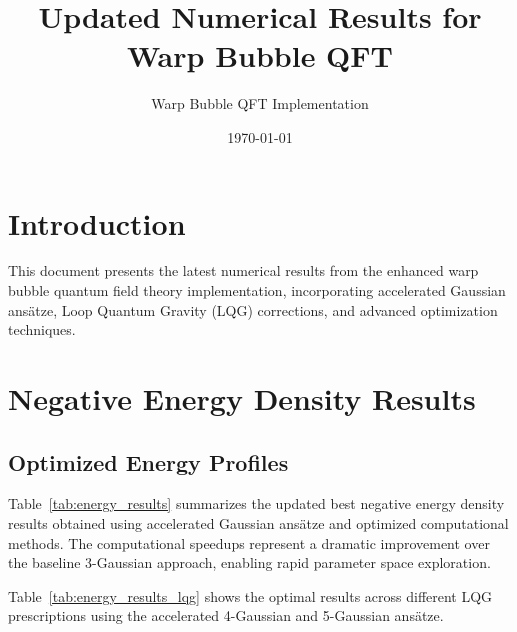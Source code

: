 \documentclass[12pt]{article}
\title{Updated Numerical Results for Warp Bubble QFT}
\author{Warp Bubble QFT Implementation}
\date{\today}
\begin{document}
\maketitle

\section{Introduction}

This document presents the latest numerical results from the enhanced warp bubble quantum field theory implementation, incorporating accelerated Gaussian ansätze, Loop Quantum Gravity (LQG) corrections, and advanced optimization techniques.

\section{Negative Energy Density Results}

\subsection{Optimized Energy Profiles}

Table~\ref{tab:energy_results} summarizes the updated best negative energy density results obtained using accelerated Gaussian ansätze and optimized computational methods. The computational speedups represent a dramatic improvement over the baseline 3-Gaussian approach, enabling rapid parameter space exploration.

Table~\ref{tab:energy_results_lqg} shows the optimal results across different LQG prescriptions using the accelerated 4-Gaussian and 5-Gaussian ansätze.
\end{document}
